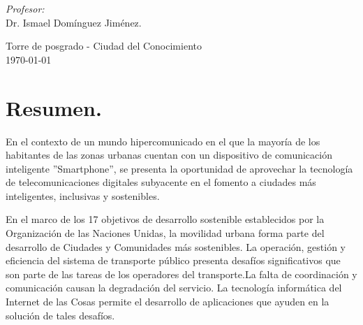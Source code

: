 \documentclass[10pt]{article}
\begin{document}
\begin{center}
\begin{minipage}{0.46\textwidth}
\begin{flushleft}
\end{flushleft}																		%
\end{minipage}		
\begin{minipage}{0.52\textwidth}		
\vspace{-0.6cm}											%
\begin{flushright} \large															%
\emph{Profesor:} \\																	%
Dr. Ismael Domínguez Jiménez.\\
\end{flushright}																	%
\end{minipage}	
\vspace*{1cm}
 	
\vspace{2cm} 																				
\begin{center}	
Torre de posgrado - Ciudad del Conocimiento \\
{\large \today}																	%
 			\end{center}												  						
\end{center}							 											
																					
\newpage																		

\tableofcontents 

\newpage

\section{Resumen.}

En el contexto de un mundo hipercomunicado en el que la mayoría de los habitantes de las zonas urbanas cuentan con un dispositivo de comunicación inteligente ''Smartphone'', se presenta la oportunidad de aprovechar la tecnología de telecomunicaciones digitales subyacente en el fomento a ciudades más inteligentes, inclusivas y sostenibles. 

En el marco de los 17 objetivos de desarrollo sostenible establecidos por la Organización de las Naciones Unidas, la movilidad urbana forma parte del desarrollo de Ciudades y Comunidades más sostenibles. La operación, gestión y eficiencia del sistema de transporte público presenta desafíos significativos que son parte de las tareas de los operadores del transporte.La falta de coordinación y comunicación causan la degradación del servicio. La tecnología informática del Internet de las Cosas permite el desarrollo de aplicaciones que ayuden en la solución de tales desafíos. 
\end{document}
